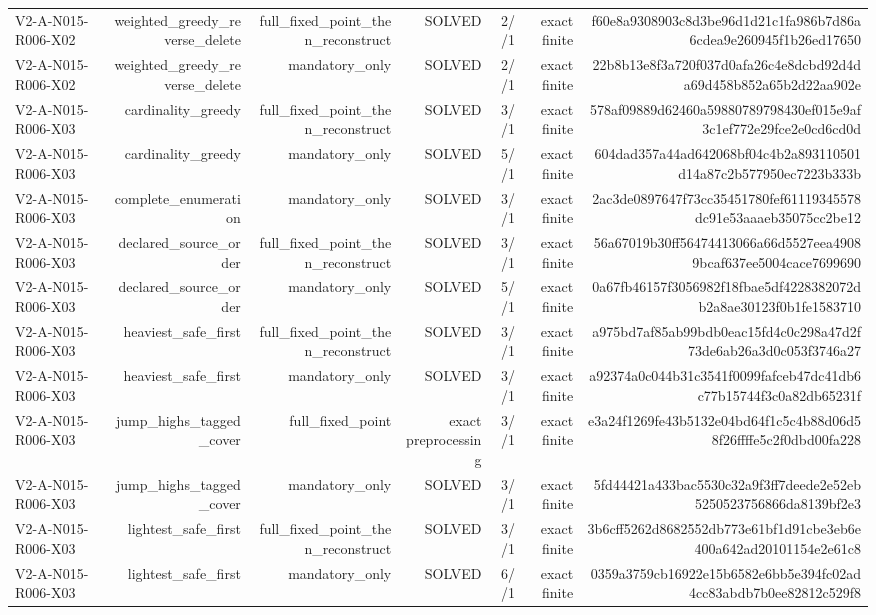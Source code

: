 {\begin{longtable}{lrrrrrr}
V2-A-N015-R006-X02 & weighted\_greedy\_reverse\_delete & full\_fixed\_point\_then\_reconstruct & SOLVED & 2//1 & exact finite & f60e8a9308903c8d3be96d1d21c1fa986b7d86a6cdea9e260945f1b26ed17650 \\
V2-A-N015-R006-X02 & weighted\_greedy\_reverse\_delete & mandatory\_only & SOLVED & 2//1 & exact finite & 22b8b13e8f3a720f037d0afa26c4e8dcbd92d4da69d458b852a65b2d22aa902e \\
V2-A-N015-R006-X03 & cardinality\_greedy & full\_fixed\_point\_then\_reconstruct & SOLVED & 3//1 & exact finite & 578af09889d62460a59880789798430ef015e9af3c1ef772e29fce2e0cd6cd0d \\
V2-A-N015-R006-X03 & cardinality\_greedy & mandatory\_only & SOLVED & 5//1 & exact finite & 604dad357a44ad642068bf04c4b2a893110501d14a87c2b577950ec7223b333b \\
V2-A-N015-R006-X03 & complete\_enumeration & mandatory\_only & SOLVED & 3//1 & exact finite & 2ac3de0897647f73cc35451780fef61119345578dc91e53aaaeb35075cc2be12 \\
V2-A-N015-R006-X03 & declared\_source\_order & full\_fixed\_point\_then\_reconstruct & SOLVED & 3//1 & exact finite & 56a67019b30ff56474413066a66d5527eea49089bcaf637ee5004cace7699690 \\
V2-A-N015-R006-X03 & declared\_source\_order & mandatory\_only & SOLVED & 5//1 & exact finite & 0a67fb46157f3056982f18fbae5df4228382072db2a8ae30123f0b1fe1583710 \\
V2-A-N015-R006-X03 & heaviest\_safe\_first & full\_fixed\_point\_then\_reconstruct & SOLVED & 3//1 & exact finite & a975bd7af85ab99bdb0eac15fd4c0c298a47d2f73de6ab26a3d0c053f3746a27 \\
V2-A-N015-R006-X03 & heaviest\_safe\_first & mandatory\_only & SOLVED & 3//1 & exact finite & a92374a0c044b31c3541f0099fafceb47dc41db6c77b15744f3c0a82db65231f \\
V2-A-N015-R006-X03 & jump\_highs\_tagged\_cover & full\_fixed\_point & exact preprocessing & 3//1 & exact finite & e3a24f1269fe43b5132e04bd64f1c5c4b88d06d58f26ffffe5c2f0dbd00fa228 \\
V2-A-N015-R006-X03 & jump\_highs\_tagged\_cover & mandatory\_only & SOLVED & 3//1 & exact finite & 5fd44421a433bac5530c32a9f3ff7deede2e52eb5250523756866da8139bf2e3 \\
V2-A-N015-R006-X03 & lightest\_safe\_first & full\_fixed\_point\_then\_reconstruct & SOLVED & 3//1 & exact finite & 3b6cff5262d8682552db773e61bf1d91cbe3eb6e400a642ad20101154e2e61c8 \\
V2-A-N015-R006-X03 & lightest\_safe\_first & mandatory\_only & SOLVED & 6//1 & exact finite & 0359a3759cb16922e15b6582e6bb5e394fc02ad4cc83abdb7b0ee82812c529f8 \\

\end{longtable}}
